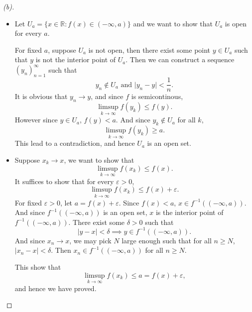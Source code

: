 \begin{proof}[(b)]
    \vphantom{text}
    \begin{itemize}
        \item [\((\implies )\)] Let $U_a = \{x \in \mathbb{R} : f(x) \in (-\infty, a)\}$ and we want to show that $U_a$ is open for every $a$.

        For fixed $a$, suppose $U_a$ is not open, then there exist some point $y \in U_a$ such that $y$ is not the interior point of $U_a$. Then we can construct a sequence $(y_n)_{n=1}^{\infty}$ such that
        \[
            y_n \notin U_a \text{ and } \lvert y_n - y \rvert < \frac{1}{n}.
        \]
        It is obvious that $y_n \to y$, and since $f$ is semicontinous, 
        \[
            \limsup_{k\to\infty} f(y_k)\le f(y).
        \]
        However since $y \in U_a$, $f(y) < a$. And since $y_k \notin U_a$ for all $k$, 
        \[
            \limsup_{k\to\infty} f(y_k) \ge a.
        \]
        This lead to a contradiction, and hence $U_a$ is an open set.
        \item [\((\impliedby )\)] Suppose $x_k \to x$, we want to show that 
        \[
            \limsup_{k\to\infty} f(x_k) \le f(x).
        \]
        It suffices to show that for every $\varepsilon > 0$,
        \[
            \limsup_{k\to\infty} f(x_k) \le f(x) + \varepsilon.
        \]
        For fixed $\varepsilon > 0$, let $a = f(x) + \varepsilon$. Since $f(x) < a$, $x \in f^{-1}((-\infty, a))$. And since $f^{-1}((-\infty, a))$ is an open set, $x$ is the interior point of $f^{-1}((-\infty, a))$. There exist some $\delta > 0$ such that
        \[
            \lvert y -x \rvert < \delta \implies y \in f^{-1}((-\infty, a)).
        \]
        And since $x_n \to x$, we may pick $N$ large enough such that for all $n \ge N$, $\lvert x_n - x \rvert < \delta$. Then $x_n \in f^{-1}((-\infty, a))$ for all $n \ge N$.

        This show that 
        \[
            \limsup_{k\to\infty} f(x_k) \le a = f(x) + \varepsilon,
        \]
        and hence we have proved.
    \end{itemize}
\end{proof}

